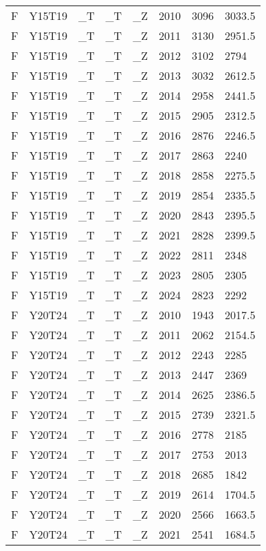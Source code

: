 \begin{longtable}[t]{llllllll}
\addlinespace
F & Y15T19 & \_T & \_T & \_Z & 2010 & 3096 & 3033.5\\
F & Y15T19 & \_T & \_T & \_Z & 2011 & 3130 & 2951.5\\
F & Y15T19 & \_T & \_T & \_Z & 2012 & 3102 & 2794\\
F & Y15T19 & \_T & \_T & \_Z & 2013 & 3032 & 2612.5\\
F & Y15T19 & \_T & \_T & \_Z & 2014 & 2958 & 2441.5\\
\addlinespace
F & Y15T19 & \_T & \_T & \_Z & 2015 & 2905 & 2312.5\\
F & Y15T19 & \_T & \_T & \_Z & 2016 & 2876 & 2246.5\\
F & Y15T19 & \_T & \_T & \_Z & 2017 & 2863 & 2240\\
F & Y15T19 & \_T & \_T & \_Z & 2018 & 2858 & 2275.5\\
F & Y15T19 & \_T & \_T & \_Z & 2019 & 2854 & 2335.5\\
\addlinespace
F & Y15T19 & \_T & \_T & \_Z & 2020 & 2843 & 2395.5\\
F & Y15T19 & \_T & \_T & \_Z & 2021 & 2828 & 2399.5\\
F & Y15T19 & \_T & \_T & \_Z & 2022 & 2811 & 2348\\
F & Y15T19 & \_T & \_T & \_Z & 2023 & 2805 & 2305\\
F & Y15T19 & \_T & \_T & \_Z & 2024 & 2823 & 2292\\
\addlinespace
F & Y20T24 & \_T & \_T & \_Z & 2010 & 1943 & 2017.5\\
F & Y20T24 & \_T & \_T & \_Z & 2011 & 2062 & 2154.5\\
F & Y20T24 & \_T & \_T & \_Z & 2012 & 2243 & 2285\\
F & Y20T24 & \_T & \_T & \_Z & 2013 & 2447 & 2369\\
F & Y20T24 & \_T & \_T & \_Z & 2014 & 2625 & 2386.5\\
\addlinespace
F & Y20T24 & \_T & \_T & \_Z & 2015 & 2739 & 2321.5\\
F & Y20T24 & \_T & \_T & \_Z & 2016 & 2778 & 2185\\
F & Y20T24 & \_T & \_T & \_Z & 2017 & 2753 & 2013\\
F & Y20T24 & \_T & \_T & \_Z & 2018 & 2685 & 1842\\
F & Y20T24 & \_T & \_T & \_Z & 2019 & 2614 & 1704.5\\
\addlinespace
F & Y20T24 & \_T & \_T & \_Z & 2020 & 2566 & 1663.5\\
F & Y20T24 & \_T & \_T & \_Z & 2021 & 2541 & 1684.5\\

\end{longtable}
